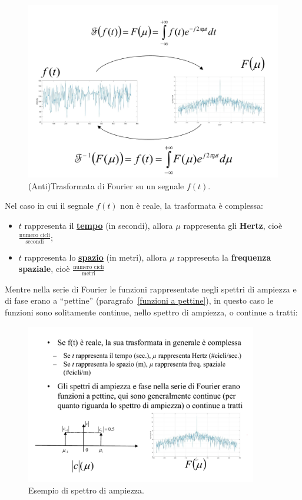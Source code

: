 \documentclass[a4paper]{article}
\newcommand{\dquotes}[1]{``#1''}
\begin{document}
	\begin{figure}[!htp]
		\centering
		\includegraphics[width=1\textwidth]{img/trasformata_fourier1.pdf}
		\caption{(Anti)Trasformata di Fourier su un segnale $f\left(t\right)$.}
	\end{figure}

	\newpage

	\noindent
	Nel caso in cui il segnale $f\left(t\right)$ non è reale, la trasformata è complessa:
	
	\begin{itemize}
		\item $t$ rappresenta il \textbf{\underline{tempo}} (in secondi), allora $\mu$ rappresenta gli \textbf{Hertz}, cioè $\frac{\text{numero cicli}}{\text{secondi}}$;
		
		\item $t$ rappresenta lo \textbf{\underline{spazio}} (in metri), allora $\mu$ rappresenta la \textbf{frequenza spaziale}, cioè $\frac{\text{numero cicli}}{\text{metri}}$
	\end{itemize}

	\noindent
	Mentre nella serie di Fourier le funzioni rappresentate negli spettri di ampiezza e di fase erano a \dquotes{pettine} (paragrafo~\ref{funzioni a pettine}), in questo caso le funzioni sono solitamente continue, nello spettro di ampiezza, o continue a tratti:
	
	\begin{figure}[!htp]
		\centering
		\includegraphics[width=0.9\textwidth]{img/trasformata_fourier2.pdf}
		\caption{Esempio di spettro di ampiezza.}
	\end{figure}
	
\end{document}
